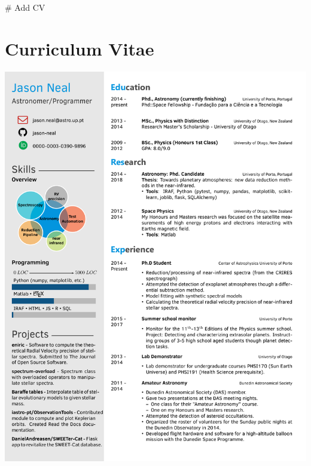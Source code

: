 
# Add CV

\section{Curriculum Vitae}\label{app_ch:cv}


{\includegraphics[width=.9\textwidth,keepaspectratio=true,page = 1, trim = 1cm 1cm 1cm 1cm, clip = true]{appendices/CV_jneal_2018.pdf}}



